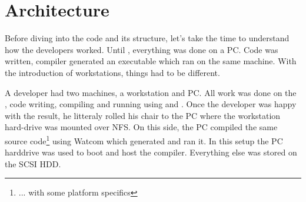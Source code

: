 \section{Architecture}
Before diving into the code and its structure, let's take the time to understand how the developers worked. Until \doom, everything was done on a PC. Code was written, compiler generated an executable which ran on the same machine. With the introduction of \NeXT workstations, things had to be different.\\
\par
A developer had two machines, a workstation and PC. All work was done on the \NeXT, code writing, compiling and running using  and . Once the developer was happy with the result, he litteraly rolled his chair to the PC where the workstation hard-drive was mounted over NFS. On this side, the PC compiled the same source code\footnote{... with some platform specifics} using Watcom which generated  and ran it. In this setup the PC harddrive was used to boot and host the compiler. Everything else was stored on the \NeXT SCSI HDD.\\
\par
{}
\par

